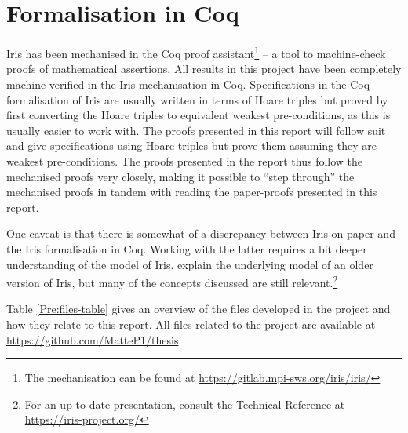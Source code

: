 \documentclass[a4paper, 10pt]{report}
\theoremstyle{definition}
\begin{document}
\section{Formalisation in Coq}
\label{Pre:section:coq}

Iris has been mechanised in the Coq proof assistant\footnote{The mechanisation can be found at \url{https://gitlab.mpi-sws.org/iris/iris/}} -- a tool to machine-check proofs of mathematical assertions. All results in this project have been completely machine-verified in the Iris mechanisation in Coq. Specifications in the Coq formalisation of Iris are usually written in terms of Hoare triples but proved by first converting the Hoare triples to equivalent weakest pre-conditions, as this is usually easier to work with. The proofs presented in this report will follow suit and give specifications using Hoare triples but prove them assuming they are weakest pre-conditions. The proofs presented in the report thus follow the mechanised proofs very closely, making it possible to ``step through'' the mechanised proofs in tandem with reading the paper-proofs presented in this report.

One caveat is that there is somewhat of a discrepancy between Iris on paper and the Iris formalisation in Coq. Working with the latter requires a bit deeper understanding of the model of Iris. \citet{DBLP:journals/jfp/JungKJBBD18} explain the underlying model of an older version of Iris, but many of the concepts discussed are still relevant.\footnote{For an up-to-date presentation, consult the Technical Reference at \url{https://iris-project.org/}}

Table \ref{Pre:files-table} gives an overview of the files developed in the project and how they relate to this report. All files related to the project are available at \url{https://github.com/MatteP1/thesis}.
\end{document}
